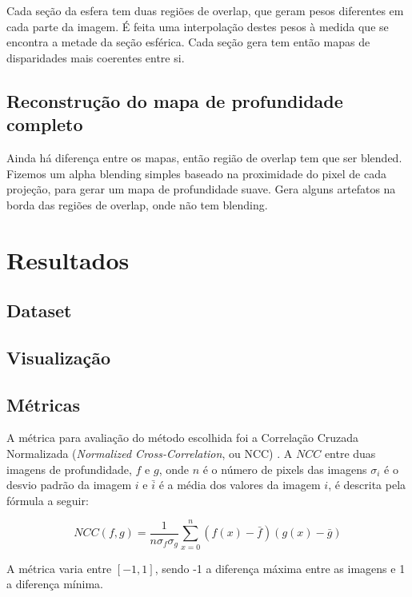 \documentclass[cic,tc]{iiufrgs}
\begin{document}
Cada seção da esfera tem duas regiões de overlap, que geram pesos diferentes em cada parte da imagem. É feita uma interpolação destes pesos à medida que se encontra a metade da seção esférica. Cada seção gera tem então mapas de disparidades mais coerentes entre si.

\section{Reconstrução do mapa de profundidade completo}

Ainda há diferença entre os mapas, então região de overlap tem que ser blended. Fizemos um alpha blending simples baseado na proximidade do pixel de cada projeção, para gerar um mapa de profundidade suave. Gera alguns artefatos na borda das regiões de overlap, onde não tem blending.

\chapter{Resultados}
\section{Dataset}

\section{Visualização}


\section{Métricas}

A métrica para avaliação do método escolhida foi a Correlação Cruzada Normalizada (\textit{Normalized Cross-Correlation}, ou NCC) \citep{NCC2006}. A $NCC$ entre duas imagens de profundidade, $f$ e $g$, onde $n$ é o número de pixels das imagens $\sigma_i$ é o desvio padrão da imagem $i$ e $\bar{i}$ é a média dos valores da imagem $i$, é descrita pela fórmula a seguir:

$$NCC(f,g) = \frac{1}{n \sigma_f \sigma_g}\sum_{x=0}^{n}(f(x)-\bar{f})(g(x)-\bar{g})$$

A métrica varia entre $[-1,1]$, sendo -1 a diferença máxima entre as imagens e 1 a diferença mínima.
\end{document}
